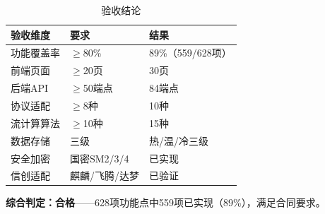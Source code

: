 \documentclass[11pt,a4paper]{ctexart}
\begin{document}
\begin{table}[H]\centering
\begin{tabular}{p{5cm}p{4cm}p{4cm}}
\toprule
\textbf{验收维度} & \textbf{要求} & \textbf{结果} \\
\midrule
功能覆盖率 & $\geq$80\% & 89\%（559/628项） \\
前端页面 & $\geq$20页 & 30页 \\
后端API & $\geq$50端点 & 84端点 \\
协议适配 & $\geq$8种 & 10种 \\
流计算算法 & $\geq$10种 & 15种 \\
数据存储 & 三级 & 热/温/冷三级 \\
安全加密 & 国密SM2/3/4 & 已实现 \\
信创适配 & 麒麟/飞腾/达梦 & 已验证 \\
\bottomrule
\end{tabular}
\caption{验收结论}
\end{table}

\textbf{综合判定：合格}——628项功能点中559项已实现（89\%），满足合同要求。
\end{document}
